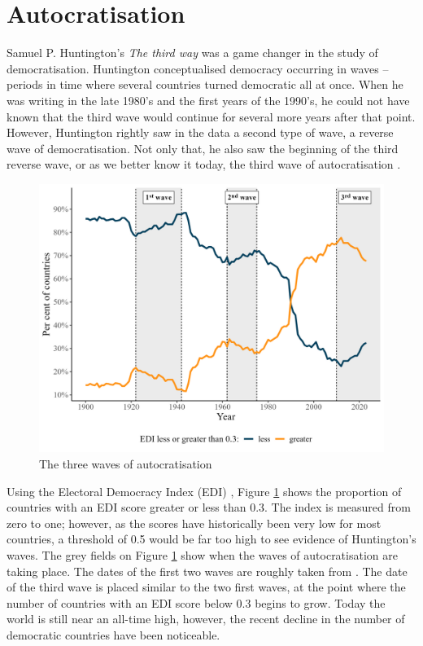 \section{Autocratisation}
Samuel P. Huntington's \textit{The third way} \citeyearpar{huntington_third_1991} was a game changer in the study of democratisation. Huntington conceptualised democracy occurring in waves -- periods in time where several countries turned democratic all at once. When he was writing in the late 1980's and the first years of the 1990's, he could not have known that the third wave would continue for several more years after that point. However, Huntington rightly saw in the data a second type of wave, a reverse wave of democratisation. Not only that, he also saw the beginning of the third reverse wave, or as we better know it today, the third wave of autocratisation \citep{huntington_third_1991}. 

\begin{figure}[hbt!]
\centering
\includegraphics[width = \textwidth]{waves.jpeg}
\caption{\label{fig:autocratisation}The three waves of autocratisation}
\end{figure}

Using the Electoral Democracy Index (EDI) \citep{coppedge_v-dem_2025}, Figure \ref{fig:autocratisation} shows the proportion of countries with an EDI score greater or less than 0.3. The index is measured from zero to one; however, as the scores have historically been very low for most countries, a threshold of 0.5 would be far too high to see evidence of Huntington's waves. The grey fields on Figure \ref{fig:autocratisation} show when the waves of autocratisation are taking place. The dates of the first two waves are roughly taken from \citet[p.16]{huntington_third_1991}. The date of the third wave is placed similar to the two first waves, at the point where the number of countries with an EDI score below 0.3 begins to grow. Today the world is still near an all-time high, however, the recent decline in the number of democratic countries have been noticeable. 

